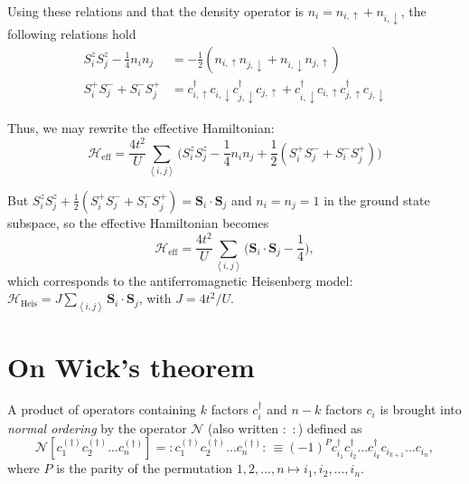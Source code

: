 Using these relations and that the density operator is $n_i = n_{i,\uparrow} + n_{i,\downarrow}$, the following relations hold
\begin{equation}
\begin{split}
S_i^z S_j^z - \frac{1}{4} n_i n_j &= -\frac{1}{2} ( n_{i,\uparrow} n_{j,\downarrow} + n_{i,\downarrow} n_{j,\uparrow} ) \\
S_i^+ S_j^- + S_i^- S_j^+ &= c_{i,\uparrow}^\dagger c_{i,\downarrow} c_{j,\downarrow}^\dagger  c_{j,\uparrow} +  c_{i,\downarrow}^\dagger c_{i,\uparrow} c_{j,\uparrow}^\dagger  c_{j,\downarrow}
\end{split}
\end{equation}

Thus, we may rewrite the effective Hamiltonian:
\begin{equation}
\mathcal{H}_{\text{eff}} = \frac{4t^2}{U} \sum_{\left\langle i, j \right\rangle} \bigg( S_i^z S_j^z - \frac{1}{4} n_i n_j + \frac{1}{2} ( S_i^+ S_j^- + S_i^- S_j^+ ) \bigg)
\end{equation}

But $S_i^z S_j^z + \frac{1}{2} ( S_i^+ S_j^- + S_i^- S_j^+) = \bm S_i \cdot \bm S_j$ and $n_i = n_j = 1$ in the ground state subspace, so the effective Hamiltonian becomes
\begin{equation}
\mathcal{H}_{\text{eff}} = \frac{4t^2}{U} \sum_{\left\langle i, j \right\rangle} \bigg( \bm S_i \cdot \bm S_j  - \frac{1}{4}  \bigg),
\end{equation}
which corresponds to the antiferromagnetic Heisenberg model: $\mathcal{H}_{\text{Heis}} = J \sum_{\left\langle i, j \right\rangle} \bm S_i \cdot \bm S_j $, with $J = 4 t^2 / U$.

\section{On Wick's theorem}
\label{sec:wick}

A product of operators containing $k$ factors $c_i^\dagger$ and $n - k$ factors $c_i$ is brought into \emph{normal ordering} by the operator $\mathcal{N}$ (also written $: \,\,:$) defined as
\begin{equation}
\mathcal{N} [ c_1^{(\dagger)} c_2^{(\dagger)} ... c_n^{(\dagger)} ] = :  c_1^{(\dagger)} c_2^{(\dagger)} ... c_n^{(\dagger)}  : \, \equiv ( - 1 )^P c_{i_1}^{\dagger} c_{i_2}^{\dagger} ... c_{i_k}^{\dagger} c_{i_{k+1}} ... c_{i_n} ,
\end{equation}
where $P$ is the parity of the permutation $1, 2, ..., n \mapsto i_1, i_2, ..., i_n$.

